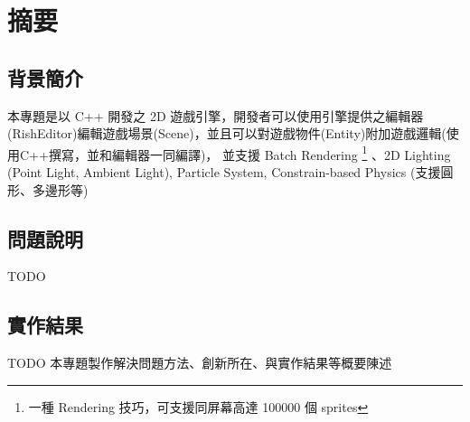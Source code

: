 \chapter{摘要}

\section{背景簡介}

本專題是以 C++ 開發之 2D 遊戲引擎，開發者可以使用引擎提供之編輯器(RishEditor)編輯遊戲場景(Scene)，並且可以對遊戲物件(Entity)附加遊戲邏輯(使用C++撰寫，並和編輯器一同編譯)，
並支援 Batch Rendering \footnote{一種 Rendering 技巧，可支援同屏幕高達 100000 個 sprites} 、2D Lighting (Point Light, Ambient Light), Particle System, Constrain-based Physics (支援圓形、多邊形等)

\section{問題說明}

TODO

\section{實作結果}

TODO 本專題製作解決問題方法、創新所在、與實作結果等概要陳述

\newpage